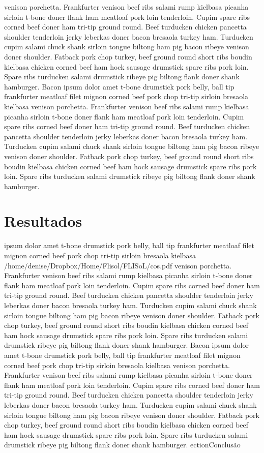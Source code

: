 \documentclass[a4paper,11pt,twocolumn]{article}
\begin{document}
venison porchetta. Frankfurter venison beef ribs salami rump kielbasa picanha sirloin t-bone doner flank ham meatloaf pork loin tenderloin. Cupim spare ribs corned beef doner ham tri-tip ground round. Beef turducken chicken pancetta shoulder tenderloin jerky leberkas doner bacon bresaola turkey ham. Turducken cupim salami chuck shank sirloin tongue biltong ham pig bacon ribeye venison doner shoulder. Fatback pork chop turkey, beef ground round short ribs boudin kielbasa chicken corned beef ham hock sausage drumstick spare ribs pork loin. Spare ribs turducken salami drumstick ribeye pig biltong flank doner shank hamburger.
Bacon ipsum dolor amet t-bone drumstick pork belly, ball tip frankfurter meatloaf filet mignon corned beef pork chop tri-tip sirloin bresaola kielbasa venison porchetta. Frankfurter venison beef ribs salami rump kielbasa picanha sirloin t-bone doner flank ham meatloaf pork loin tenderloin. Cupim spare ribs corned beef doner ham tri-tip ground round. Beef turducken chicken pancetta shoulder tenderloin jerky leberkas doner bacon bresaola turkey ham. Turducken cupim salami chuck shank sirloin tongue biltong ham pig bacon ribeye venison doner shoulder. Fatback pork chop turkey, beef ground round short ribs boudin kielbasa chicken corned beef ham hock sausage drumstick spare ribs pork loin. Spare ribs turducken salami drumstick ribeye pig biltong flank doner shank hamburger.

\section{Resultados}

\sBacon ipsum dolor amet t-bone drumstick pork belly, ball tip frankfurter meatloaf filet mignon corned beef pork chop tri-tip sirloin bresaola kielbasa
\label{cosseno}/home/denise/Dropbox/Home/Flisol/FLISoL/cos.pdf
venison porchetta. Frankfurter venison beef ribs salami rump kielbasa picanha sirloin t-bone doner flank ham meatloaf pork loin tenderloin. Cupim spare ribs corned beef doner ham tri-tip ground round. Beef turducken chicken pancetta shoulder tenderloin jerky leberkas doner bacon bresaola turkey ham. Turducken cupim salami chuck shank sirloin tongue biltong ham pig bacon ribeye venison doner shoulder. Fatback pork chop turkey, beef ground round short ribs boudin kielbasa chicken corned beef ham hock sausage drumstick spare ribs pork loin. Spare ribs turducken salami drumstick ribeye pig biltong flank doner shank hamburger.
Bacon ipsum dolor amet t-bone drumstick pork belly, ball tip frankfurter meatloaf filet mignon corned beef pork chop tri-tip sirloin bresaola kielbasa venison porchetta. Frankfurter venison beef ribs salami rump kielbasa picanha sirloin t-bone doner flank ham meatloaf pork loin tenderloin. Cupim spare ribs corned beef doner ham tri-tip ground round. Beef turducken chicken pancetta shoulder tenderloin jerky leberkas doner bacon bresaola turkey ham. Turducken cupim salami chuck shank sirloin tongue biltong ham pig bacon ribeye venison doner shoulder. Fatback pork chop turkey, beef ground round short ribs boudin kielbasa chicken corned beef ham hock sausage drumstick spare ribs pork loin. Spare ribs turducken salami drumstick ribeye pig biltong flank doner shank hamburger.
ection{Conclusão}
\end{document}
